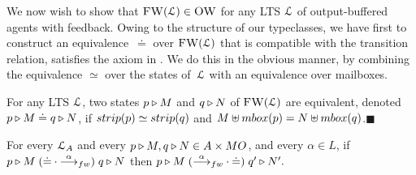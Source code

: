 We now wish to show that $\textsc{FW}(\mathcal{L}) \in \textsc{OW}$ for any LTS
$\mathcal{L}$ of output-buffered agents with feedback.
Owing to the structure of our typeclasses, we have first to construct an
equivalence~$\doteq$ over $\textsc{FW}(\mathcal{L})$ that is compatible with the
transition relation, \ie satisfies the axiom in .
We do this in the obvious manner, \ie by combining the equivalence $\simeq$
over the states of~$\mathcal{L}$ with an equivalence over mailboxes.

\begin{definition}
  \label{def:fw-eq}
  For any LTS $\mathcal{L}$, two states $p \triangleright M$
    and $q \triangleright N$ of $\textsc{FW}(\mathcal{L})$ are
  equivalent, denoted
  $p \triangleright M \doteq q \triangleright N$, if
  $ \strip{ \serverA } \simeq \strip{ \serverB }$ and
  $M \uplus \outputmultiset{\serverA} = N \uplus
  \outputmultiset{\serverB}$.\hfill$\blacksquare$
\end{definition}



\begin{lemma}
  \label{lem:harmony-sta}
  For every $\mathcal{L}_A$ and every
  $p \triangleright M, q \triangleright N \in A \times MO$,
  and every $\alpha \in L$, if
  $
  \serverA \triangleright M \mathrel{({\doteq} \cdot {\sta{\alpha}})}
  \serverB \triangleright N
  $ then
  $
  \serverA  \triangleright M \mathrel{({\sta{\alpha}} \cdot {\doteq})} \serverB' \triangleright N'.
  $
\end{lemma}






